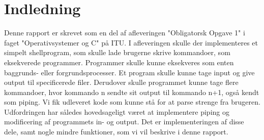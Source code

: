 \section{Indledning}
Denne rapport er skrevet som en del af afleveringen "Obligatorsk Opgave 1" i faget "Operativsystemer og C" på ITU.
I afleveringen skulle der implementeres et simpelt shellprogram, som skulle lade brugerne skrive kommandoer, som eksekverede programmer.
Programmer skulle kunne eksekveres som enten baggrunds- eller forgrundsprocesser. Et program skulle kunne tage input og give output til specificerede filer. Derudover skulle programmet kunne tage flere kommandoer, hvor kommando n sendte sit output til kommando n+1, også kendt som piping. Vi fik udleveret kode som kunne stå for at parse strenge fra brugeren. Udfordringen har således hovedsageligt været at implementere piping og modificering af programmets in- og output. Det er implementeringen af disse dele, samt nogle mindre funktioner, som vi vil beskrive i denne rapport.
